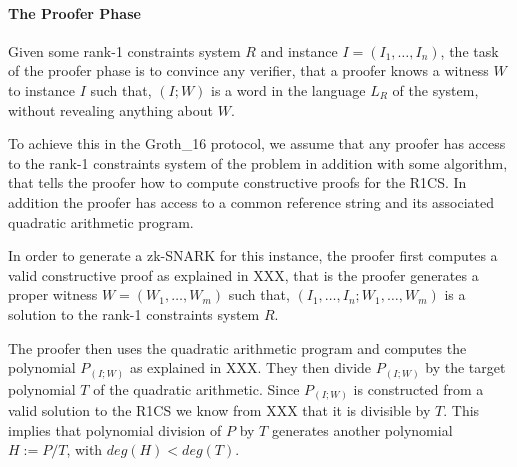 \paragraph{The Proofer Phase} Given some rank-1 constraints system $R$ and instance $I=(I_1,\ldots, I_n)$, the task of the proofer phase is to convince any verifier, that a proofer knows a witness $W$ to instance $I$ such that,  $(I;W)$ is a word in the language $L_R$ of the system, without revealing anything about $W$. 

To achieve this in the Groth\_16 protocol, we assume that any proofer has access to the rank-1 constraints system of the problem in addition with some algorithm, that tells the proofer how to compute constructive proofs for the R1CS. In addition the proofer has access to a common reference string and its associated quadratic arithmetic program. 

In order to generate a zk-SNARK for this instance, the proofer first computes a valid constructive proof as explained in XXX, that is the proofer generates a proper witness $W= (W_1,\ldots,W_m)$ such that,  $(I_1,\ldots, I_n; W_1,\ldots,W_m)$ is a solution to the rank-1 constraints system $R$. 

The proofer then uses the quadratic arithmetic program and computes the polynomial $P_{(I;W)}$ as explained in XXX. They then divide $P_{(I;W)}$ by the target polynomial $T$ of the quadratic arithmetic. Since $P_{(I;W)}$ is constructed from a valid solution to the R1CS we know from XXX that it is divisible by $T$. This implies that polynomial division of $P$ by $T$ generates another polynomial $H:= P / T$, with $deg(H)<deg(T)$. 

